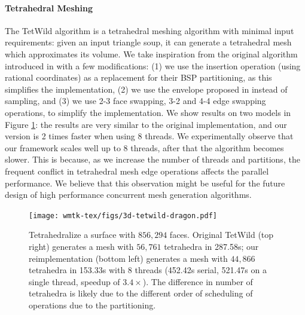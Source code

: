 \paragraph{Tetrahedral Meshing}

The TetWild algorithm is a tetrahedral meshing algorithm with minimal input requirements: given an input triangle soup, it can generate a tetrahedral mesh which approximates its volume. We {take inspiration from} the original algorithm introduced in \cite{hu2018tetrahedral,Hu:2019:fTetWild} with a few modifications: (1) we use the insertion operation \cite{Hu:2019:fTetWild} (using rational coordinates) as a replacement for their BSP partitioning, as this simplifies the implementation, (2) we use the envelope proposed in \cite{Wang:2020:FE} instead of sampling, and (3) we use 2-3 face swapping, 3-2 and 4-4 edge swapping operations, to simplify the implementation. We show results on two models in Figure \ref{fig:tetwild}: the results are very similar to the original implementation, and our version is 2 times faster when using 8 threads. {We experimentally observe that our framework scales well up to 8 threads, after that the algorithm becomes slower. This is because, as we increase the number of threads and partitions, the frequent conflict in tetrahedral mesh edge operations affects the parallel performance. We believe that this observation might be useful for the future design of high performance concurrent mesh generation algorithms.}




\begin{figure}
    \centering\footnotesize
    \texttt{[image: wmtk-tex/figs/3d-tetwild-dragon.pdf]}
    \caption{Tetrahedralize a surface with $856,294$ faces. Original TetWild (top right) generates a mesh with $56,761$ tetrahedra in 287.58s; our reimplementation (bottom left) generates a mesh with $44,866$ tetrahedra in 153.33s with 8 threads (452.42s serial, 521.47s on a single thread, speedup of $3.4\times$). The difference in number of tetrahedra is likely due to the different order of scheduling of operations due to the partitioning.}
    \label{fig:tetwild}
\end{figure}

